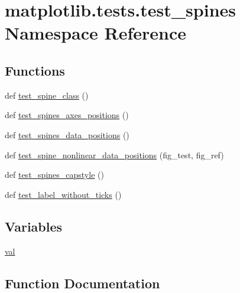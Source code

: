 \hypertarget{namespacematplotlib_1_1tests_1_1test__spines}{}\section{matplotlib.\+tests.\+test\+\_\+spines Namespace Reference}
\label{namespacematplotlib_1_1tests_1_1test__spines}
\subsection*{Functions}
\begin{DoxyCompactItemize}
\item 
def \hyperlink{namespacematplotlib_1_1tests_1_1test__spines_a0d9a448a30a268475b61d6fe89230259}{test\+\_\+spine\+\_\+class} ()
\item 
def \hyperlink{namespacematplotlib_1_1tests_1_1test__spines_a0b91b9c83db711b85c4c5b62c8e566fe}{test\+\_\+spines\+\_\+axes\+\_\+positions} ()
\item 
def \hyperlink{namespacematplotlib_1_1tests_1_1test__spines_a662d72cb34321d0be035d18052d27659}{test\+\_\+spines\+\_\+data\+\_\+positions} ()
\item 
def \hyperlink{namespacematplotlib_1_1tests_1_1test__spines_a8266bd5f52627233a6e38407a87405a0}{test\+\_\+spine\+\_\+nonlinear\+\_\+data\+\_\+positions} (fig\+\_\+test, fig\+\_\+ref)
\item 
def \hyperlink{namespacematplotlib_1_1tests_1_1test__spines_af219fd4ff497b7dddc57c0b885c38e10}{test\+\_\+spines\+\_\+capstyle} ()
\item 
def \hyperlink{namespacematplotlib_1_1tests_1_1test__spines_a288cf3f6359a23b378b0f18332a9361d}{test\+\_\+label\+\_\+without\+\_\+ticks} ()
\end{DoxyCompactItemize}
\subsection*{Variables}
\begin{DoxyCompactItemize}
\item 
\hyperlink{namespacematplotlib_1_1tests_1_1test__spines_aff3474f224034184c567818da0315bf6}{val}
\end{DoxyCompactItemize}


\subsection{Function Documentation}
\mbox{\label{namespacematplotlib_1_1tests_1_1test__spines_a288cf3f6359a23b378b0f18332a9361d}} 
